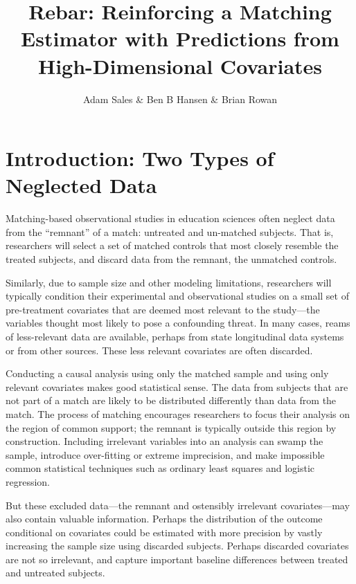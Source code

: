 \documentclass[12pt]{article}\usepackage[]{graphicx}\usepackage[]{color}
\title{Rebar: Reinforcing a Matching Estimator with Predictions from
  High-Dimensional Covariates}
\author{Adam Sales \& Ben B Hansen \& Brian Rowan}
\begin{document}
\maketitle



\section{Introduction: Two Types of Neglected Data}

Matching-based observational studies in
education sciences often neglect data from the ``remnant'' of a match:
untreated and un-matched subjects.
That is, researchers
will select a set of matched controls that most closely resemble the
treated subjects, and discard data from the remnant, the unmatched
controls.

Similarly, due to sample size and other modeling limitations,
researchers will typically condition their experimental and
observational studies on a small set of pre-treatment covariates that
are deemed most relevant to the study---the variables thought most likely to
pose a confounding threat.
In many cases, reams of less-relevant data are available, perhaps from
state longitudinal data systems or from other sources.
These less relevant covariates are often discarded.

Conducting a causal analysis using only the
matched sample and using only relevant covariates makes good
statistical sense. The data from subjects that are not
part of a match are likely to be distributed
differently than data from the match.
The process of matching encourages researchers to focus their analysis
on the region of common support; the remnant is typically
outside this region by construction.
Including irrelevant variables into an analysis can swamp the sample,
introduce over-fitting or extreme imprecision, and make
impossible common statistical techniques such as ordinary least
squares and logistic regression.

But these excluded data---the remnant and ostensibly irrelevant
covariates---may also contain valuable information.
Perhaps the distribution of the outcome conditional on covariates
could be estimated with more precision by vastly increasing the sample
size using discarded subjects.
Perhaps discarded covariates are not so irrelevant, and capture important baseline differences
between treated and untreated subjects.
\end{document}
